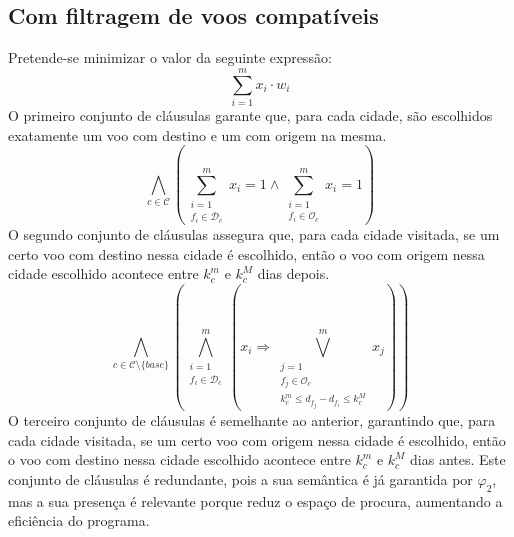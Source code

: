 \documentclass[12pt,a4paper]{article}
\begin{document}
    \subsection{Com filtragem de voos compatíveis}
        \label{1}
        Pretende-se minimizar o valor da seguinte expressão:
        \begin{equation}
            \sum_{i = 1}^m x_i \cdot w_i
            \label{minimize_1}
        \end{equation}
        O primeiro conjunto de cláusulas garante que, para cada cidade, são escolhidos exatamente um voo com destino e um com origem na mesma.
        \begin{equation}
            \bigwedge_{c \in \mathcal{C}}
            \left(
            \sum_{\substack{i = 1 \\
                            f_i \in \mathcal{D}_c}}
                ^{m}
                {x_i} = 1
            \land
            \sum_{\substack{i = 1 \\
                            f_i \in \mathcal{O}_c}}
                ^{m}
                {x_i} = 1
            \right)
            \label{exactly_one_per_c_1}
        \end{equation}
        O segundo conjunto de cláusulas assegura que, para cada cidade visitada, se um certo voo com destino nessa cidade é escolhido, então o voo com origem nessa cidade escolhido acontece entre $k_c^m$ e $k_c^M$ dias depois.
        \begin{equation}
            \bigwedge_{c \in \mathcal{C} \setminus \{base\}}
            \left(
            \bigwedge_{\substack{i = 1 \\
                                 f_i \in \mathcal{D}_c}}
                     ^{m}
            \left(
            x_i \Rightarrow
            \bigvee_{\substack{j = 1 \\
                               f_j \in \mathcal{O}_c \\
                               k_c^m \leq d_{f_j} - d_{f_i} \leq k_c^M}}
                ^{m}
                {x_j}
            \right)
            \right)
            \label{k_nights_departures}
        \end{equation}
        O terceiro conjunto de cláusulas é semelhante ao anterior, garantindo que, para cada cidade visitada, se um certo voo com origem nessa cidade é escolhido, então o voo com destino nessa cidade escolhido acontece entre $k_c^m$ e $k_c^M$ dias antes. Este conjunto de cláusulas é redundante, pois a sua semântica é já garantida por $\varphi_2$, mas a sua presença é relevante porque reduz o espaço de procura, aumentando a eficiência do programa.
\end{document}
